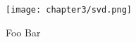 
\begin{figure}[ht]
    \centering

  {\texttt{[image: chapter3/svd.png]}}
  \vspace{0pt}
    \caption{Foo Bar}
    \label{fig:3_2_svd}
\end{figure}